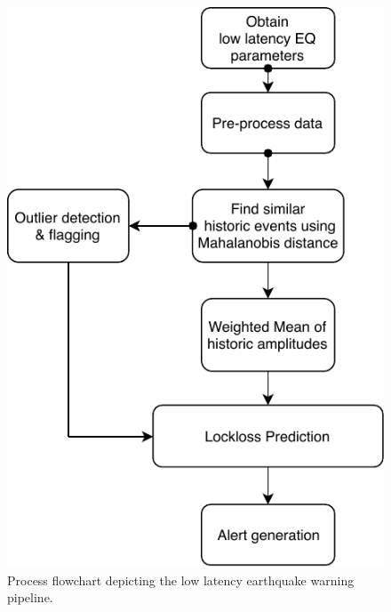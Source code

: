 \documentclass[preprint, aps, showpacs]{revtex4-1}
\begin{document}
 \begin{figure}[!htb]
 \includegraphics[scale=0.7]{./plots/SEISMON_flowchart.pdf}
 \caption{Process flowchart depicting the low latency earthquake warning pipeline.}
 \label{fig:flowchart}
\end{figure}   
\end{document}
